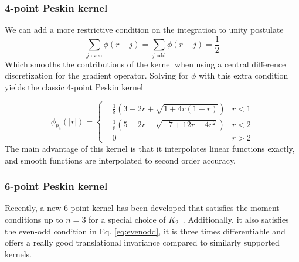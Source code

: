 \documentclass[twoside,openright,titlepage,numbers=noenddot,%
headinclude,footinclude,cleardoublepage=empty,abstract=on,
BCOR=5mm,fontsize=11pt, dvipsnames, paper=b5
]{scrreprt}
\newcommand{\half}{\frac{1}{2}}
\begin{document}
\subsubsection*{4-point Peskin kernel}
We can add a more restrictive condition on the integration to unity postulate
\begin{equation}
  \label{eq:evenodd}
  \sum_{j \textrm{ even}} \phi(r-j)  =  \sum_{j \textrm{ odd}} \phi(r-j) = \half
\end{equation}
Which smooths the contributions of the kernel when using a central difference discretization for the gradient operator.
Solving for $\phi$ with this extra condition yields the classic 4-point Peskin kernel

\begin{equation}
  \label{eq:peskin4}
  \phi_{p_4}(|r|) =  \left\{
  \begin{aligned}
    & \frac{1}{8}\left( 3 - 2r + \sqrt{1+4r(1-r)}\right)& r < 1\\
    & \frac{1}{8}\left(5-2r-\sqrt{-7+12r-4r^2}\right)& r < 2\\
    & 0 & r>2
  \end{aligned}\right.
\end{equation}
The main advantage of this kernel is that it interpolates linear functions exactly, and smooth functions are interpolated to second order accuracy.

\subsubsection*{6-point Peskin kernel}
Recently, a new 6-point kernel has been developed that satisfies the moment conditions up to $n=3$ for a special choice of $K_2$~\cite{Bao2016}. Additionally, it also satisfies the even-odd condition in Eq. \eqref{eq:evenodd}, it is three times differentiable and offers a really good translational invariance compared to similarly supported kernels.
\end{document}

